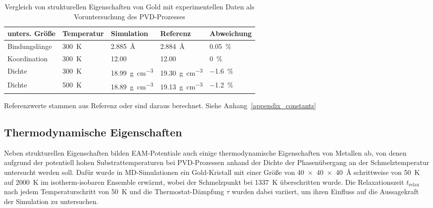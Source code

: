 \begin{table}[hbt]
  \begin{threeparttable}
  \oddrowcolors
  \caption[Vergleich von strukturellen Eigenschaften von Gold]{
    Vergleich von strukturellen Eigenschaften von Gold mit experimentellen Daten als Voruntersuchung des PVD-Prozesses
  }
  \label{tab:goldpreresults}
  \begin{tabularx}{\textwidth}{|lXXXX|}
    \hline
    \textbf{unters. Größe} & \textbf{Temperatur} & \textbf{Simulation}                     & \textbf{Referenz}\tnote{a}              & \textbf{Abweichung} \\
    \hline
    Bindungslänge          & \SI{300}{\kelvin}   & \SI{2.885}{\angstrom}                   & \SI{2.884}{\angstrom}                   & \SI{0.05}{\percent} \\
    Koordination           & \SI{300}{\kelvin}   & \SI{12.00}{}                            & \SI{12.00}{}                            & \SI{0}{\percent}    \\
    Dichte                 & \SI{300}{\kelvin}   & \SI{18.99}{\gram\per\cubic\centi\meter} & \SI{19.30}{\gram\per\cubic\centi\meter} & \SI{-1.6}{\percent} \\
    Dichte                 & \SI{500}{\kelvin}   & \SI{18.89}{\gram\per\cubic\centi\meter} & \SI{19.13}{\gram\per\cubic\centi\meter} & \SI{-1.2}{\percent} \\
    \hline
  \end{tabularx}
  \begin{tablenotes}
    \item[a] Referenzwerte stammen aus Referenz\cite{haynes_crc_2011} oder sind daraus berechnet.
      Siehe Anhang~\ref{appendix_constants}
  \end{tablenotes}
  \end{threeparttable}
\end{table}

\subsection{Thermodynamische Eigenschaften}
\label{goldthermo}

Neben strukturellen Eigenschaften bilden EAM-Potentiale auch einige thermodynamische Eigenschaften von Metallen ab, von denen aufgrund der potentiell hohen Substrattemperaturen bei PVD-Prozessen\cite{gottsche_uber_1956} anhand der Dichte der Phasenübergang an der Schmelztemperatur untersucht werden soll.
Dafür wurde in MD-Simulationen ein Gold-Kristall mit einer Größe von \SI{40x40x40}{\angstrom} schrittweise von \SI{50}{\kelvin} auf \SI{2000}{\kelvin} im isotherm-isobaren Ensemble erwärmt, wobei der Schmelzpunkt bei \SI{1337}{\kelvin}\cite{haynes_crc_2011} überschritten wurde.
Die Relaxationszeit $t_\text{relax}$ nach jedem Temperaturschritt von \SI{50}{\kelvin} und die Thermostat-Dämpfung $\tau$ wurden dabei variiert, um ihren Einfluss auf die Aussagekraft der Simulation zu untersuchen.

